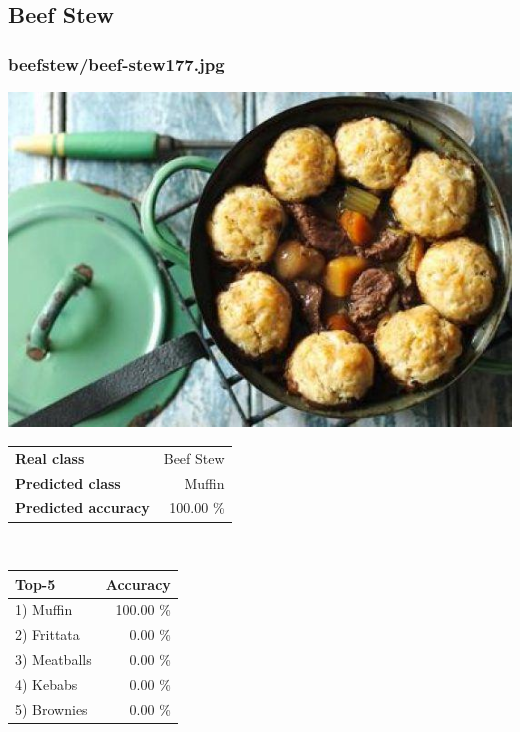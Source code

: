 \subsection{Beef Stew}
    
\subsubsection{beef\textunderscore stew/beef-stew177.jpg}

\begin{minipage}[t]{0.4\textwidth}
	\vspace{0pt}
	\includegraphics[width=\linewidth]{images/evaluation-images/beef_stew/beef-stew177.jpg}
\end{minipage}
\hfill
\begin{minipage}[t]{0.5\textwidth}
	\vspace{0pt}\raggedright
	\begin{tabularx}{\textwidth}{X r}
		\small \textbf{Real class} & \small Beef Stew\\
		\small \textbf{Predicted class} & \small Muffin\\
		\small \textbf{Predicted accuracy} & \small 100.00 \%
    \end{tabularx}\\
    
    \vspace{6pt}
	\begin{tabularx}{\textwidth}{X r}
        \small \textbf{Top-5} & \small \textbf{Accuracy} \\
        \hline
		\small 1) Muffin & \small 100.00 \%\\\small 2) Frittata & \small 0.00 \%\\\small 3) Meatballs & \small 0.00 \%\\\small 4) Kebabs & \small 0.00 \%\\\small 5) Brownies & \small 0.00 \%
    \end{tabularx}
\end{minipage}
    
